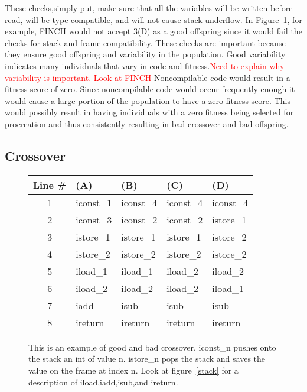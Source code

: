 \documentclass{sig-alternate}
\newcommand{\mycomment}[1]{\textcolor{red}{#1}}
\begin{document}
These checks,simply put, make sure that all the variables will be written before read, will be type-compatible, and will not cause stack underflow\cite{FINCH2:2009}. In Figure~\ref{crossover}, for example, FINCH would not accept 3(D) as a good offspring since it would fail the checks for stack and frame compatibility.
These checks are important because they ensure good offspring and variability in the population. Good variability indicates many individuals that vary in code and fitness.\mycomment{Need to explain why variability is important. Look at FINCH} Noncompilable code would result in a fitness score of zero. Since noncompilable code would occur frequently enough it would cause a large portion of the population to have a zero fitness score. This would possibly result in having individuals with a zero fitness being selected for procreation and thus consistently resulting in bad crossover and bad offspring.



\subsection{Crossover}

\begin{figure}
\begin{tabular}{|c|l|l|l|l|}

\hline
Line \#&(A)&(B)&(C)&(D)\\  \hline
1&iconst\_1&iconst\_4&iconst\_4&iconst\_4\\
2&iconst\_3&iconst\_2&iconst\_2&istore\_1\\
3&istore\_1&istore\_1&istore\_1&istore\_2\\
4&istore\_2&istore\_2&istore\_2&istore\_2\\
5&iload\_1&iload\_1&iload\_2&iload\_2\\
6&iload\_2&iload\_2&iload\_2&iload\_1\\
7&iadd&isub&isub&isub\\
8&ireturn&ireturn&ireturn&ireturn\\
\hline
\end{tabular}
\caption{This is an example of good and bad crossover. iconst\_n pushes onto the stack an int of value n. istore\_n pops the stack and saves the value on the frame at index n. Look at figure~\ref{stack} for a description of iload,iadd,isub,and ireturn.}
\label{crossover}
  
\end{figure}
\end{document}
